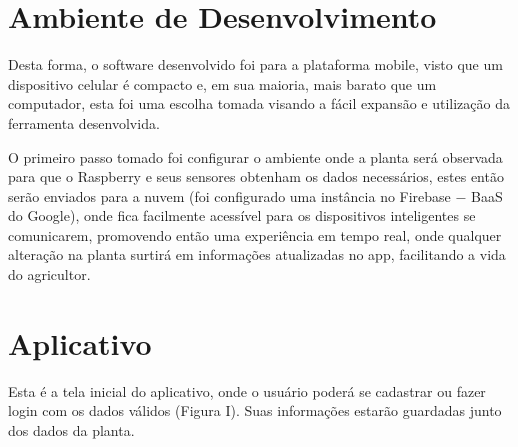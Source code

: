 \documentclass[eso]{bcc}
\begin{document}
\section{Ambiente de Desenvolvimento}
Desta forma, o software desenvolvido foi para a plataforma mobile, visto que um dispositivo 
celular é compacto e, em sua maioria, mais barato que um computador, esta foi uma escolha 
tomada visando a fácil expansão e utilização da ferramenta desenvolvida.

O primeiro passo tomado foi configurar o ambiente onde a planta será observada para que o 
Raspberry e seus sensores obtenham os  dados necessários, estes então serão enviados para a 
nuvem (foi configurado uma instância no Firebase $-$ BaaS do Google), onde fica facilmente acessível 
para os dispositivos inteligentes se comunicarem, promovendo então uma experiência em tempo real, 
onde qualquer alteração na planta surtirá em informações atualizadas no app, facilitando a vida 
do agricultor.

\section{Aplicativo}
Esta é a tela inicial do aplicativo, onde o usuário poderá se cadastrar ou fazer login com 
os dados válidos (Figura I). Suas informações estarão guardadas junto dos dados da planta.
\end{document}
